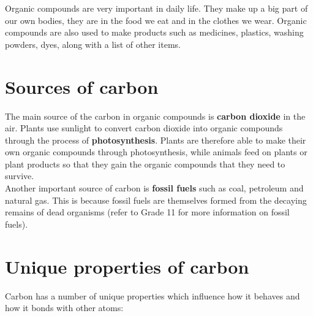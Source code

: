 Organic compounds are very important in daily life. They make up a big part of our own bodies, they are in the food we eat and in the clothes we wear. Organic compounds are also used to make products such as medicines, plastics, washing powders, dyes, along with a list of other items. 






\section{Sources of carbon}
\label{sec:om:sources}

The main source of the carbon in organic compounds is \textbf{carbon dioxide} in the air. Plants use sunlight to convert carbon dioxide into organic compounds through the process of \textbf{photosynthesis}. Plants are therefore able to make their own organic compounds through photosynthesis, while animals feed on plants or plant products so that they gain the organic compounds that they need to survive. \\

Another important source of carbon is \textbf{fossil fuels} such as coal, petroleum and natural gas. This is because fossil fuels are themselves formed from the decaying remains of dead organisms (refer to Grade 11 for more information on fossil fuels). 






\section{Unique properties of carbon}
\label{sec:om:properties}

Carbon has a number of unique properties which influence how it behaves and how it bonds with other atoms:

